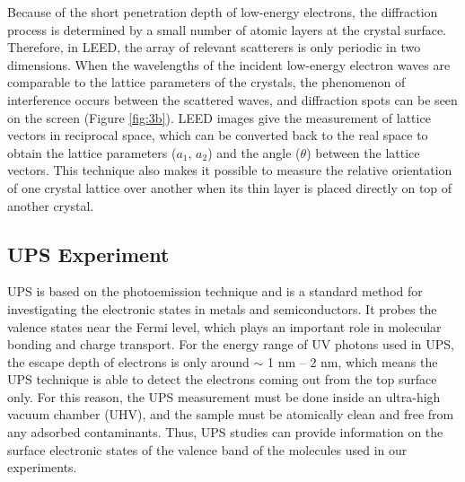 \documentclass[12pt]{article}
\begin{document}
Because of the short penetration depth of low-energy electrons, the diffraction process is determined by a small number of atomic layers at the crystal surface. Therefore, in LEED, the array of relevant scatterers is only periodic in two dimensions. When the wavelengths of the incident low-energy electron waves are comparable to the lattice parameters of the crystals, the phenomenon of interference occurs between the scattered waves, and diffraction spots can be seen on the screen (Figure \ref{fig:3b}). LEED images give the measurement of lattice vectors in reciprocal space, which can be converted back to the real space to obtain the lattice parameters ($a_1$, $a_2$) and the angle ($\theta$) between the lattice vectors. This technique also makes it possible to measure the relative orientation of one crystal lattice over another when its thin layer is placed directly on top of another crystal.

\subsection{UPS Experiment}

UPS is based on the photoemission technique and is a standard method for investigating the electronic states in metals and semiconductors. It probes the valence states near the Fermi level, which plays an important role in molecular bonding and charge transport. For the energy range of UV photons used in UPS, the escape depth of electrons is only around $\sim$ 1 nm – 2 nm, which means the UPS technique is able to detect the electrons coming out from the top surface only. For this reason, the UPS measurement must be done inside an ultra-high vacuum chamber (UHV), and the sample must be atomically clean and free from any adsorbed contaminants. Thus, UPS studies can provide information on the surface electronic states of the valence band of the molecules used in our experiments. 
\end{document}

